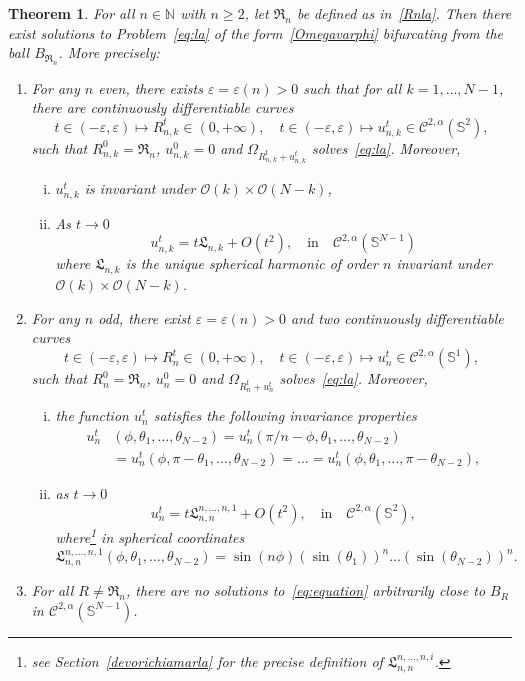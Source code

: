 \documentclass[10pt,reqno,english]{amsart}
\newcommand{\Sd}{\mathbb{S}^2}
\newcommand{\Sn}{\mathbb{S}^{N-1}}
\newcommand{\Su}{\mathbb{S}^1}
\newcommand{\rn}{{\mathfrak R}_n  }
\newcommand{\ve}{\varepsilon}
\newtheorem{theorem}{Theorem}
\theoremstyle{definition}
\numberwithin{equation}{section}
\begin{document}
\begin{theorem}
\label{thm_lambda}
For all $n \in \mathbb{N}$ with $n \ge 2$, let $\rn$ be defined as in~\eqref{Rnla}. Then there exist solutions to Problem~\eqref{eq:la} of the form~\eqref{Omegavarphi} bifurcating from the ball $B_{\rn}$. More precisely:
\begin{enumerate}[$\!\!$(1)$\!\!$]
\item For any  $n$  even, there exists $\ve=\ve(n)>0$ such that for all $k=1,\dots,N-1$,
there are continuously differentiable curves 
\[
t\in(-\ve,\ve)\mapsto R_{n,k}^t\in(0,+\infty), \quad t \in(-\ve,\ve)\mapsto u_{n,k}^t\in\mathcal C^{2,\alpha}(\Sd),
\]
such that $R_{n,k}^0= \rn$, $u_{n,k}^0 =0$ and $\Omega_{R_{n,k}^t+u_{n,k}^t}$ solves~\eqref{eq:la}. Moreover,
\begin{enumerate}[i)]
\item $u_{n,k}^t$ is invariant under $\mathcal O(k)\times \mathcal O(N-k)$,
\item As $t \to 0$
\[
u_{n,k}^t = t \mathfrak L_{n,k} + O(t^2), \quad {\mbox {in}} \quad \mathcal C^{2,\alpha}(\Sn)
\]
where $\mathfrak L_{n,k}$ is the unique spherical harmonic of order $n$ invariant under $\mathcal O(k) \times \mathcal O(N-k)$.
\end{enumerate}
\item For any $n$ odd, there exist $\ve=\ve(n)>0$ and two continuously differentiable curves 
\[
 t\in(-\ve,\ve)\mapsto R_n^t\in(0,+\infty), \quad t\in(-\ve,\ve)\mapsto u_n^t\in\mathcal C^{2,\alpha}(\Su),
 \]
 such that $R_n^0= \rn$, $u_n^0=0$ and $\Omega_{R_n^t+u_n^t}$ solves~\eqref{eq:la}. Moreover,
\begin{enumerate}[i)]
\item the function $u_n^t$ satisfies the following invariance properties
\[
\begin{aligned}
u_n^t&(\phi,\theta_1,\dots,\theta_{N-2})=u_n^t(\pi/n-\phi,\theta_1,\dots,\theta_{N-2})\\
&=u_n^t(\phi,\pi-\theta_1,\dots,\theta_{N-2})=\dots=u_n^t(\phi,\theta_1,\dots,\pi-\theta_{N-2}),
\end{aligned}
\]
\item as $t \to 0$
 \[
u_n^t=t \mathfrak L^{n,\dots,n,1}_{n,n}+O(t^2), \quad {\mbox {in}} \quad \mathcal C^{2,\alpha}(\Sd),
 \]
 where\footnote{see Section~\ref{devorichiamarla} for the precise definition of $\mathfrak L^{n,\dots,n,i}_{n,n}$.} in spherical coordinates
\[
\mathfrak L^{n,\dots,n,1}_{n,n}(\phi,\theta_1,\dots,\theta_{N-2})=\sin(n\phi)(\sin(\theta_1))^n\dots(\sin(\theta_{N-2}))^n.
\]
\end{enumerate}
\item For all $R\not=\rn$, there are no solutions to~\eqref{eq:equation} arbitrarily close to $B_R$ in $\mathcal C^{2,\alpha}(\Sn)$.
\end{enumerate}
\end{theorem}
\end{document}
